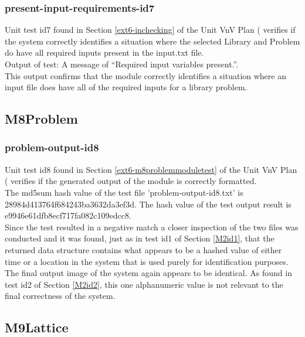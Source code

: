 \documentclass[12pt, titlepage]{article}
\begin{document}
\subsubsection{present-input-requirements-id7}

Unit test id7 found in Section \ref{ext6-inchecking} of the Unit VnV Plan (\citet{LBM_UVNV_PM} verifies if the system correctly identifies a situation where the selected Library and Problem do have all required inputs present in the input.txt file.\\

\noindent Output of test: A message of ``Required input variables present.''.\\

\noindent This output confirms that the module correctly identifies a situation where an input file does have all of the required inputs for a library problem.

\subsection{M8Problem}
\subsubsection{problem-output-id8}

Unit test id8 found in Section \ref{ext6-m8problemmoduletest} of the Unit VnV Plan (\citet{LBM_UVNV_PM} verifies if the generated output of the module is correctly formatted.\\

\noindent The md5sum hash value of the test file 'problem-output-id8.txt' is\\  28984d413764f684243ba3632da3ef3d. The hash value of the test output result is e9946e61dfb8ecf717fa082c109edcc8.\\ 

\noindent Since the test resulted in a negative match a closer inspection of the two files was conducted and it was found, just as in test id1 of Section \ref{M2id1}, that the returned data structure contains what appears to be a hashed value of either time or a location in the system that is used purely for identification purposes. The final output image of the system again appears to be identical. As found in test id2 of Section \ref{M2id2}, this one alphanumeric value is not relevant to the final correctness of the system.

\subsection{M9Lattice}
\end{document}
